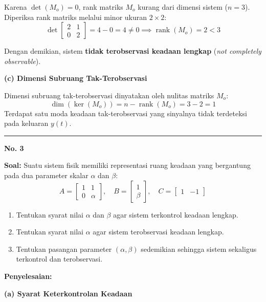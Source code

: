 \documentclass[11pt,a4paper]{article}
\begin{document}
Karena $\det(M_o) = 0$, rank matriks $M_o$ kurang dari dimensi sistem ($n=3$). Diperiksa rank matriks melalui minor ukuran $2 \times 2$:
$$\det \begin{bmatrix} 2 & 1 \\ 0 & 2 \end{bmatrix} = 4 - 0 = 4 \ne 0 \implies \operatorname{rank}(M_o) = 2 < 3$$

Dengan demikian, sistem \textbf{tidak terobservasi keadaan lengkap} (\textit{not completely observable}).

\textbf{(c) Dimensi Subruang Tak-Terobservasi}

Dimensi subruang tak-terobservasi dinyatakan oleh nulitas matriks $M_o$:
$$\dim(\ker(M_o)) = n - \operatorname{rank}(M_o) = 3 - 2 = 1$$
Terdapat satu moda keadaan tak-terobservasi yang sinyalnya tidak terdeteksi pada keluaran $y(t)$.

\vspace{12pt}
\hrule
\vspace{10pt}

\textbf{\large No. 3}

\textbf{Soal:}  
Suatu sistem fisik memiliki representasi ruang keadaan yang bergantung pada dua parameter skalar $\alpha$ dan $\beta$:
$$A = \begin{bmatrix} 1 & 1 \\ 0 & \alpha \end{bmatrix}, \quad B = \begin{bmatrix} 1 \\ \beta \end{bmatrix}, \quad C = \begin{bmatrix} 1 & -1 \end{bmatrix}$$
\begin{enumerate}[label=(\alph*)]
    \item Tentukan syarat nilai $\alpha$ dan $\beta$ agar sistem terkontrol keadaan lengkap.
    \item Tentukan syarat nilai $\alpha$ agar sistem terobservasi keadaan lengkap.
    \item Tentukan pasangan parameter $(\alpha, \beta)$ sedemikian sehingga sistem sekaligus terkontrol dan terobservasi.
\end{enumerate}

\textbf{Penyelesaian:}

\textbf{(a) Syarat Keterkontrolan Keadaan}
\end{document}
